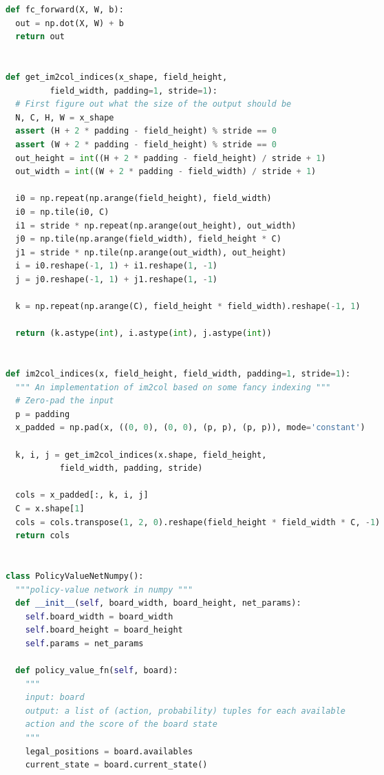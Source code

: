 \documentclass[a4paper]{article}
\begin{document}
\begin{multicols}{2}
\begin{lstlisting}[language=Python,breaklines = true,columns=flexible]
def fc_forward(X, W, b):
  out = np.dot(X, W) + b
  return out


def get_im2col_indices(x_shape, field_height,
         field_width, padding=1, stride=1):
  # First figure out what the size of the output should be
  N, C, H, W = x_shape
  assert (H + 2 * padding - field_height) % stride == 0
  assert (W + 2 * padding - field_height) % stride == 0
  out_height = int((H + 2 * padding - field_height) / stride + 1)
  out_width = int((W + 2 * padding - field_width) / stride + 1)

  i0 = np.repeat(np.arange(field_height), field_width)
  i0 = np.tile(i0, C)
  i1 = stride * np.repeat(np.arange(out_height), out_width)
  j0 = np.tile(np.arange(field_width), field_height * C)
  j1 = stride * np.tile(np.arange(out_width), out_height)
  i = i0.reshape(-1, 1) + i1.reshape(1, -1)
  j = j0.reshape(-1, 1) + j1.reshape(1, -1)

  k = np.repeat(np.arange(C), field_height * field_width).reshape(-1, 1)

  return (k.astype(int), i.astype(int), j.astype(int))


def im2col_indices(x, field_height, field_width, padding=1, stride=1):
  """ An implementation of im2col based on some fancy indexing """
  # Zero-pad the input
  p = padding
  x_padded = np.pad(x, ((0, 0), (0, 0), (p, p), (p, p)), mode='constant')

  k, i, j = get_im2col_indices(x.shape, field_height,
           field_width, padding, stride)

  cols = x_padded[:, k, i, j]
  C = x.shape[1]
  cols = cols.transpose(1, 2, 0).reshape(field_height * field_width * C, -1)
  return cols


class PolicyValueNetNumpy():
  """policy-value network in numpy """
  def __init__(self, board_width, board_height, net_params):
    self.board_width = board_width
    self.board_height = board_height
    self.params = net_params

  def policy_value_fn(self, board):
    """
    input: board
    output: a list of (action, probability) tuples for each available
    action and the score of the board state
    """
    legal_positions = board.availables
    current_state = board.current_state()


\end{lstlisting}
\end{multicols}
\end{document}
